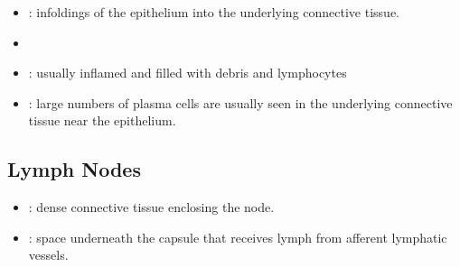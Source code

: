 \begin{itemize}
\begin{multicols}{2}
\begin{itemize}
    \item {}: infoldings of the epithelium into the underlying connective tissue. 
    
    \begin{center}
    \end{center}
    
    \item {}
    
    \begin{center}
    \end{center}

    \item {}: usually inflamed and filled with debris and lymphocytes 
    
    \begin{center}
    \end{center}
    
    \item {}:  large numbers of plasma cells are usually seen in the underlying connective tissue near the epithelium.
    
    \begin{center}
    \end{center}
    
  \end{itemize}
  \end{multicols}

  \subsection{Lymph Nodes}\label{Lymph Nodes}
  \begin{multicols}{2}
  \begin{itemize}
    \item {}: dense connective tissue enclosing the node.
    
    \begin{center}
    \end{center}
    
    \item {}: space underneath the capsule that receives lymph from afferent lymphatic vessels.
    

\end{itemize}
\end{multicols}
\end{itemize}
